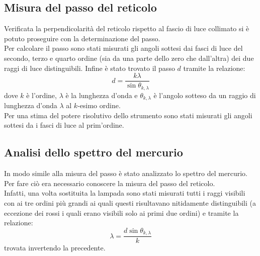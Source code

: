\documentclass[a4paper,10pt]{article}
\begin{document}
	\subsection{Misura del passo del reticolo}
	Verificata la perpendicolarità del reticolo rispetto al fascio di luce collimato si è potuto proseguire con la determinazione del passo.\\
	Per calcolare il passo sono stati misurati gli angoli sottesi dai fasci di luce del secondo, terzo e quarto ordine (sia da una parte dello zero che dall'altra) dei due raggi di luce distinguibili. Infine è stato trovato il passo $ d $ tramite la relazione:
	\[ d=\frac{k \lambda}{\sin\theta_{k,\lambda}} \]
	dove $ k $ è l'ordine, $ \lambda $ è la lunghezza d'onda e $ \theta_{k,\lambda} $ è l'angolo sotteso da un raggio di lunghezza d'onda $ \lambda $ al $ k $-esimo ordine.\\
	Per una stima del potere risolutivo dello strumento sono stati misurati gli angoli sottesi da i fasci di luce al prim'ordine.
	\subsection{Analisi dello spettro del mercurio}
	In modo simile alla misura del passo è stato analizzato lo spettro del mercurio. Per fare ciò era necessario conoscere la misura del passo del reticolo. \\
	Infatti, una volta sostituita la lampada sono stati misurati tutti i raggi visibili con ai tre ordini più grandi ai quali questi risultavano nitidamente distinguibili (a eccezione dei rossi i quali erano visibili solo ai primi due ordini) e tramite la relazione:
	\[ \lambda =\frac{d\sin\theta_{k,\lambda}}{k} \]
	trovata invertendo la precedente.
\end{document}
